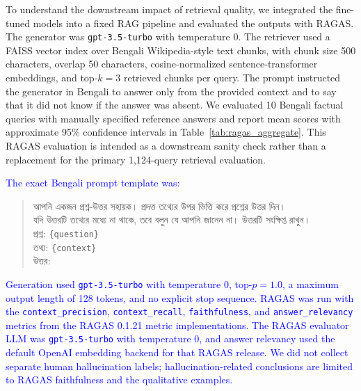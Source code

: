 \documentclass[manuscript,screen,review]{acmart}
\newcommand{\revise}[1]{\textcolor{blue}{#1}}
\newcommand{\bn}[1]{{\bengalifont #1}}
\begin{document}
To understand the downstream impact of retrieval quality, we integrated the fine-tuned models into a fixed RAG pipeline and evaluated the outputs with RAGAS. The generator was \texttt{gpt-3.5-turbo} with temperature 0. The retriever used a FAISS vector index over Bengali Wikipedia-style text chunks, with chunk size 500 characters, overlap 50 characters, cosine-normalized sentence-transformer embeddings, and top-$k=3$ retrieved chunks per query. The prompt instructed the generator in Bengali to answer only from the provided context and to say that it did not know if the answer was absent. We evaluated 10 Bengali factual queries with manually specified reference answers and report mean scores with approximate 95\% confidence intervals in Table~\ref{tab:ragas_aggregate}. This RAGAS evaluation is intended as a downstream sanity check rather than a replacement for the primary 1,124-query retrieval evaluation.

\revise{The exact Bengali prompt template was:}
\begingroup
\color{blue}
\small
\begin{quote}
\bn{আপনি একজন প্রশ্ন-উত্তর সহায়ক। প্রদত্ত তথ্যের উপর ভিত্তি করে প্রশ্নের উত্তর দিন।}\\
\bn{যদি উত্তরটি তথ্যের মধ্যে না থাকে, তবে বলুন যে আপনি জানেন না। উত্তরটি সংক্ষিপ্ত রাখুন।}\\
\bn{প্রশ্ন:} \texttt{\{question\}}\\
\bn{তথ্য:} \texttt{\{context\}}\\
\bn{উত্তর:}
\end{quote}
\endgroup

\revise{Generation used \texttt{gpt-3.5-turbo} with temperature 0, top-$p=1.0$, a maximum output length of 128 tokens, and no explicit stop sequence. RAGAS was run with the \texttt{context\_precision}, \texttt{context\_recall}, \texttt{faithfulness}, and \texttt{answer\_relevancy} metrics from the RAGAS 0.1.21 metric implementations. The RAGAS evaluator LLM was \texttt{gpt-3.5-turbo} with temperature 0, and answer relevancy used the default OpenAI embedding backend for that RAGAS release. We did not collect separate human hallucination labels; hallucination-related conclusions are limited to RAGAS faithfulness and the qualitative examples.}
\end{document}
